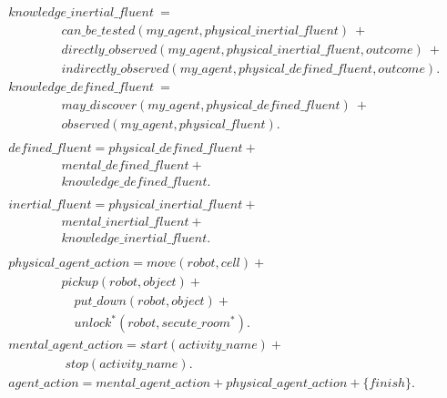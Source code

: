 \documentclass[11pt, oneside]{article}
\begin{document}
\begin{allowdisplaybreaks}
\begin{align*}
\\
 &knowledge\_inertial\_fluent\ =\\
 &\hspace{50pt}can\_be\_tested(my\_agent, physical\_inertial\_fluent)\ +\\
 &\hspace{50pt}directly\_observed(my\_agent, physical\_inertial\_fluent, outcome)\ +\\
 &\hspace{50pt}indirectly\_observed(my\_agent, physical\_defined\_fluent, outcome).\\
&knowledge\_defined\_fluent\ =\\
&\hspace{50pt}may\_discover(my\_agent, physical\_defined\_fluent)\ +\\
&\hspace{50pt}observed(my\_agent,physical\_fluent).\\
\\
&defined\_fluent = physical\_defined\_fluent +\\ 
&\hspace{50pt}mental\_defined\_fluent +\\
&\hspace{50pt}knowledge\_defined\_fluent.\\
\\
&inertial\_fluent = physical\_inertial\_fluent + \\
&\hspace{50pt}mental\_inertial\_fluent +\\
&\hspace{50pt}knowledge\_inertial\_fluent.\\
\\
&physical\_agent\_action =   move(robot, cell) +\\
  &\hspace{50pt} pickup(robot,object) +\\
  &\hspace{50pt}\quad put\_down(robot,object) +\\
  &\hspace{50pt}\quad unlock^*(robot,secute\_room^*).\\
&mental\_agent\_action =   start(activity\_name) +\\
  &\hspace{50pt}\; stop(activity\_name).\\
  &agent\_action = mental\_agent\_action + physical\_agent\_action + \{finish\}.\\
\\

\end{align*}
\end{allowdisplaybreaks}
\end{document}
